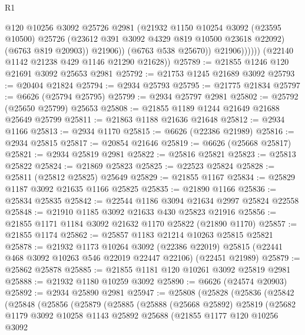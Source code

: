 \begin{lexlean}{R1}
\begin{coremodule}
                        @120
                        @10256
                        @3092
                        @25726
                        @2981
                        (@21932
                          @1150
                          @10254
                          @3092
                          (@23595 @10500)
                          @25726
                          (@23612 @391 @3092 @4329 @819 @10500 @23618 @22092)
                          (@6763 @819 @20903))
                        @21906))
                    (@6763 @538 @25670))
                  @21906))))))
      (@22140 @1142 @21238 @429 @1146 @21290 @21628))
@25789 := @21855 @1246 @120 @21691 @3092 @25653 @2981
@25792 := @21753 @1245 @21689 @3092
@25793 := @20404 @21824
@25794 := @2934 @25793
@25795 := @21775 @21834
@25797 := @6626 (@25794 @25795)
@25799 := @2934 @25797 @2981
@25802 := @25792 (@25650 @25799) @25653
@25808 := @21855 @1189 @1244 @21649 @21688 @25649 @25799
@25811 := @21863 @1188 @21636 @21648
@25812 := @2934 @1166
@25813 := @2934 @1170
@25815 := @6626 (@22386 @21989)
@25816 := @2934 @25815
@25817 := @20854 @21646
@25819 := @6626 (@25668 @25817)
@25821 := @2934 @25819 @2981
@25822 := @25816 @25821
@25823 := @25813 @25822
@25824 := @21869 @25823
@25825 := @22523 @25824
@25828 := @25811 (@25812 @25825) @25649
@25829 := @21855 @1167
@25834 := @25829 @1187 @3092 @21635 @1166 @25825
@25835 := @21890 @1166
@25836 := @25834 @25835
@25842 := @22544 @1186 @3094 @21634 @2997 @25824 @22558
@25848 := @21910 @1185 @3092 @21633 @430 @25823 @21916
@25856 := @21855 @1171 @1184 @3092 @21632 @1170 @25822 (@21890 @1170)
@25857 := @21855 @1174
@25862 := @25857 @1183 @21214 @10263 @25815 @25821
@25878 := @21932
    @1173
    @10264
    @3092
    (@22386 @22019)
    @25815
    (@22441 @468 @3092 @10263 @546 @22019 @22447 @22106)
    (@22451 @21989)
@25879 := @25862 @25878
@25885 := @21855 @1181 @120 @10261 @3092 @25819 @2981
@25888 := @21932 @1180 @10259 @3092
@25890 := @6626 (@24574 @20903)
@25892 := @2934 @25890 @2981
@25947 := @25808
    (@25828
      (@25836
        (@25842
          (@25848
            (@25856
              (@25879
                (@25885
                  (@25888
                    (@25668 @25892)
                    @25819
                    (@25682
                      @1179
                      @3092
                      @10258
                      @1143
                      @25892
                      @25688
                      (@21855
                        @1177
                        @120
                        @10256
                        @3092

\end{coremodule}
\end{lexlean}

